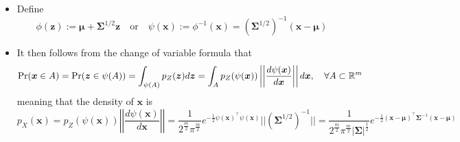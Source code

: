 \documentclass[12pt,a4paper]{article}
\begin{document}
\begin{itemize}
\begin{itemize}
\begin{itemize}
      \item Define
        \begin{equation}\nonumber%
          \phi(\bm{z}) := \bm{\mu} + \bm{\Sigma}^{1/2}\bm{z}
          \quad\text{or} \quad
          \psi(\bm{x}):=\phi^{-1}(\bm{x})= (\bm{\Sigma}^{1/2})^{-1}(\bm{x}-\bm{\mu})
        \end{equation}
    
      \item It then follows from the change of variable formula that
        \begin{equation}\nonumber%
          \text{Pr}(\bm{x}\in A)
          =
          \text{Pr}(\bm{z} \in \psi(A))
          =
          \int_{\psi(A)}p_{Z}(\bm{z})d\bm{z}
          =
          \int_{A}p_{Z}(\psi(\bm{x})) \left|\left| \frac{d\psi(\bm{x})}{d\bm{x}} \right| \right| d\bm{x},
          \quad \forall A\subset \R^{m}
        \end{equation}
        meaning that the density of $\bm{x}$ is
        \begin{equation}\nonumber%
          p_{X}(\bm{x})
          =
          p_{Z}(\psi(\bm{x})) \left| \left| \frac{d\psi(\bm{x})}{d\bm{x}} \right| \right|
          =
          \frac{1}{2^{\frac{m}{2}}\pi^{\frac{m}{2}}}e^{- \frac{1}{2}\psi(\bm{x})^{\top}\psi(\bm{x})}
          ||(\bm{\Sigma}^{1/2})^{-1}||
          =
          \frac{1}{2^{\frac{m}{2}}\pi^{\frac{m}{2}}|\bm{\Sigma}|^{\frac{1}{2}}} e^{- \frac{1}{2}(\bm{x}-\bm{\mu})^{\top}\bm{\Sigma}^{-1}(\bm{x}-\bm{\mu})}
        \end{equation}
    \end{itemize}

  \end{itemize}


\end{itemize}
\end{document}
